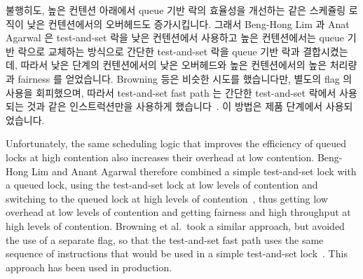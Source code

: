 불행히도, 높은 컨텐션 아래에서 queue 기반 락의 효율성을 개선하는 같은 스케쥴링
로직이 낮은 컨텐션에서의 오버헤드도 증가시킵니다.
그래서 Beng-Hong Lim 과 Anat Agarwal 은 test-and-set 락을 낮은 컨텐션에서
사용하고 높은 컨텐션에서는 queue 기반 락으로 교체하는 방식으로 간단한
test-and-set 락을 queue 기반 락과 결합시켰는데, 따라서 낮은 단계의 컨텐션에서의
낮은 오버헤드와 높은 컨텐션에서의 높은 처리량과 fairness 를 얻었습니다.
Browning 등은 비슷한 시도를 했습니다만, 별도의 flag 의 사용을 회피했으며,
따라서 test-and-set fast path 는 간단한 test-and-set 락에서 사용되는 것과 같은
인스트럭션만을 사용하게 했습니다~\cite{LukeBrowning2005SimpleLockNUMAAware}.
이 방법은 제품 단계에서 사용되었습니다.

\iffalse

Unfortunately, the same scheduling logic that improves the efficiency
of queued locks at high contention also increases their overhead at
low contention.
Beng-Hong Lim and Anant Agarwal therefore combined a simple test-and-set
lock with a queued lock, using the test-and-set lock at low levels of
contention and switching to the queued lock at high levels of
contention~\cite{BengHongLim94}, thus getting low overhead at low levels
of contention and getting fairness and high throughput at high levels
of contention.
Browning et al.\ took a similar approach, but avoided the use of a separate
flag, so that the test-and-set fast path uses the same sequence of
instructions that would be used in a simple test-and-set
lock~\cite{LukeBrowning2005SimpleLockNUMAAware}.
This approach has been used in production.

